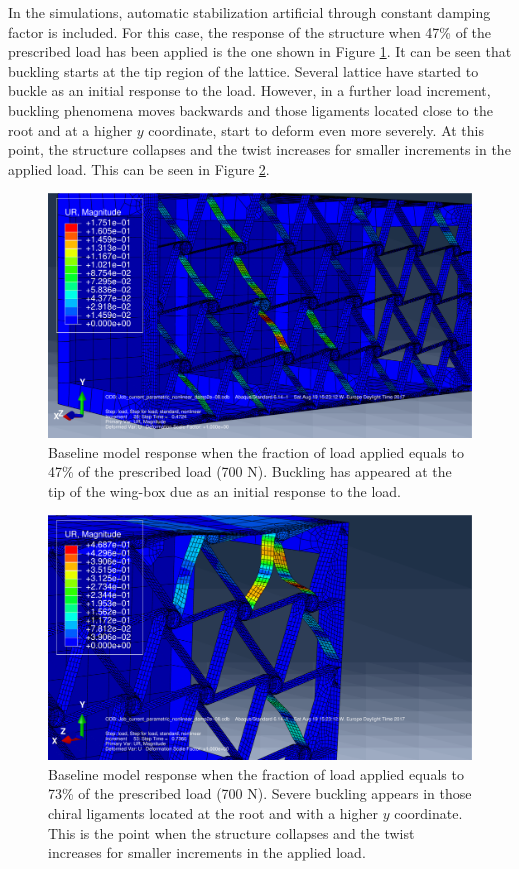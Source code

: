   In the simulations, automatic stabilization artificial through constant damping factor is included. For this case, the response of the structure when 47\% of the prescribed load has been applied is the one shown in Figure \ref{fig:1-UR}. It can be seen that buckling starts at the tip region of the lattice. Several lattice have started to buckle as an initial response to the load. However, in a further load increment, buckling phenomena moves backwards and those ligaments located close to the root and at a higher $y$ coordinate, start to deform even more severely. At this point, the structure collapses and the twist increases for smaller increments in the applied load. This can be seen in Figure \ref{fig:2-UR}.

  \begin{figure}[!htpb] %
    \centering
    \includegraphics[width=0.8 \textwidth]{../figures/result-sim/1-UR}
    \caption[Baseline model response when the fraction of load applied equals to 47\% of the prescribed load (700 N)]{Baseline model response when the fraction of load applied equals to 47\% of the prescribed load (700 N). Buckling has appeared at the tip of the wing-box due as an initial response to the load.}\label{fig:1-UR}
  \end{figure}

  \begin{figure}[!htpb] %
    \centering
    \includegraphics[width=0.8 \textwidth]{../figures/result-sim/2-UR}
    \caption[Baseline model response when the fraction of load applied equals to 73\% of the prescribed load (700 N)]{Baseline model response when the fraction of load applied equals to 73\% of the prescribed load (700 N). Severe buckling appears in those chiral ligaments located at the root and with a higher $y$ coordinate. This is the point when the structure collapses and the twist increases for smaller increments in the applied load.}\label{fig:2-UR}
  \end{figure}

